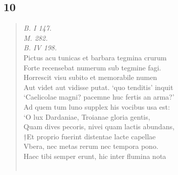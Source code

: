 \documentclass[11pt, a4paper]{report}
\begin{document}
            \subsection*{10}
      \begin{verse}
      \textit{B. I 147.} \\ \textit{M. 282.} \\ \textit{B. IV 198.} \\ Pictus acu tunicas et barbara tegmina crurum \\ Forte recensebat numerum sub tegmine fagi. \\ Horrescit visu subito et memorabile numen \\ Aut videt aut vidisse putat. ‘quo tenditis’ inquit \\ ‘Caelicolae magni? pacemne huc fertis an arma?’ \\ Ad quem tum luno supplex his vocibus usa est: \\ ‘O lux Dardaniae, Troianae gloria gentis, \\ Quam dives pecoris, nivei quam lactis abundans, \\ †Et proprio fuerint distentae lacte capellae \\ Vbera, nec metas rerum nec tempora pono. \\ Haec tibi semper erunt, hic inter flumina nota \\ 
        ﻿\pagebreak 

\end{verse}
\end{document}
